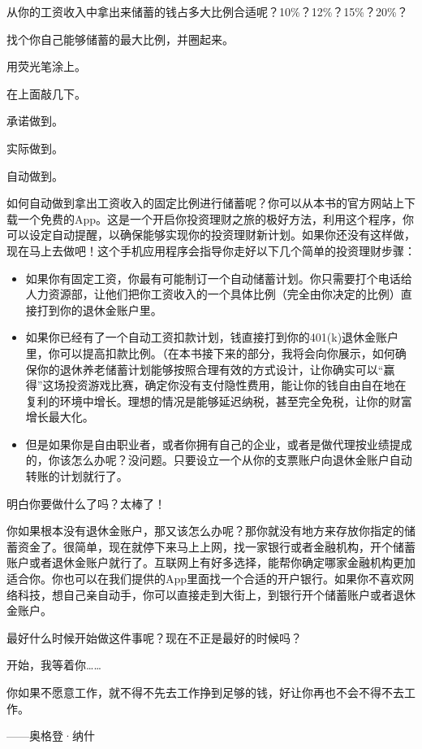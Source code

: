 从你的工资收入中拿出来储蓄的钱占多大比例合适呢？10\%？12\%？15\%？20\%？

找个你自己能够储蓄的最大比例，并圈起来。

用荧光笔涂上。

在上面敲几下。

承诺做到。

实际做到。

自动做到。

如何自动做到拿出工资收入的固定比例进行储蓄呢？你可以从本书的官方网站上下载一个免费的App。这是一个开启你投资理财之旅的极好方法，利用这个程序，你可以设定自动提醒，以确保能够实现你的投资理财新计划。如果你还没有这样做，现在马上去做吧！这个手机应用程序会指导你走好以下几个简单的投资理财步骤：

\begin{itemize}
\item 如果你有固定工资，你最有可能制订一个自动储蓄计划。你只需要打个电话给人力资源部，让他们把你工资收入的一个具体比例（完全由你决定的比例）直接打到你的退休金账户里。
\item 如果你已经有了一个自动工资扣款计划，钱直接打到你的401(k)退休金账户里，你可以提高扣款比例。（在本书接下来的部分，我将会向你展示，如何确保你的退休养老储蓄计划能够按照合理有效的方式设计，让你确实可以“赢得”这场投资游戏比赛，确定你没有支付隐性费用，能让你的钱自由自在地在复利的环境中增长。理想的情况是能够延迟纳税，甚至完全免税，让你的财富增长最大化。
\item 但是如果你是自由职业者，或者你拥有自己的企业，或者是做代理按业绩提成的，你该怎么办呢？没问题。只要设立一个从你的支票账户向退休金账户自动转账的计划就行了。
\end{itemize}

明白你要做什么了吗？太棒了！

你如果根本没有退休金账户，那又该怎么办呢？那你就没有地方来存放你指定的储蓄资金了。很简单，现在就停下来马上上网，找一家银行或者金融机构，开个储蓄账户或者退休金账户就行了。互联网上有好多选择，能帮你确定哪家金融机构更加适合你。你也可以在我们提供的App里面找一个合适的开户银行。如果你不喜欢网络科技，想自己亲自动手，你可以直接走到大街上，到银行开个储蓄账户或者退休金账户。

最好什么时候开始做这件事呢？现在不正是最好的时候吗？

开始，我等着你……

\begin{BookQuote}
你如果不愿意工作，就不得不先去工作挣到足够的钱，好让你再也不会不得不去工作。

\hfill ——奥格登·纳什
\end{BookQuote}

